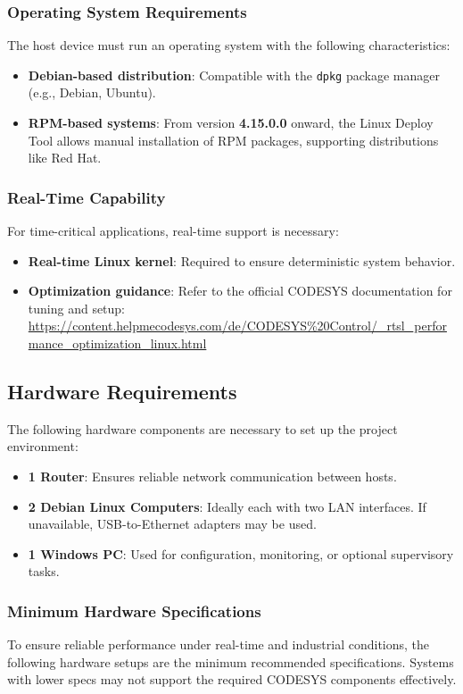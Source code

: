 \documentclass[a4paper,12pt]{article}
\begin{document}
\subsubsection{Operating System Requirements}
The host device must run an operating system with the following characteristics:

\begin{itemize}
	\item \textbf{Debian-based distribution}: Compatible with the \texttt{dpkg} package manager (e.g., Debian, Ubuntu).
	\item \textbf{RPM-based systems}: From version \textbf{4.15.0.0} onward, the Linux Deploy Tool allows manual installation of RPM packages, supporting distributions like Red Hat.
\end{itemize}

\subsubsection{Real-Time Capability}
For time-critical applications, real-time support is necessary:

\begin{itemize}
	\item \textbf{Real-time Linux kernel}: Required to ensure deterministic system behavior.
	\item \textbf{Optimization guidance}: Refer to the official CODESYS documentation for tuning and setup:
	\url{https://content.helpmecodesys.com/de/CODESYS%20Control/_rtsl_performance_optimization_linux.html}
\end{itemize}

\subsection{Hardware Requirements}
The following hardware components are necessary to set up the project environment:

\begin{itemize}
	\item \textbf{1 Router}: Ensures reliable network communication between hosts.
	\item \textbf{2 Debian Linux Computers}: Ideally each with two LAN interfaces. If unavailable, USB-to-Ethernet adapters may be used.
	\item \textbf{1 Windows PC}: Used for configuration, monitoring, or optional supervisory tasks.
\end{itemize}

\subsubsection{Minimum Hardware Specifications}
To ensure reliable performance under real-time and industrial conditions, the following hardware setups are the minimum recommended specifications. Systems with lower specs may not support the required CODESYS components effectively.
\end{document}
